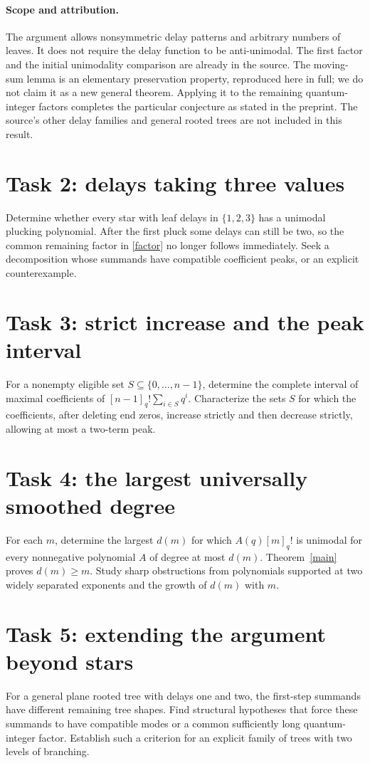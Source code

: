 \documentclass[11pt]{article}
\begin{document}
\paragraph{Scope and attribution.}
The argument allows nonsymmetric delay patterns and arbitrary
numbers of leaves. It does not require the delay function to be
anti-unimodal. The first factor and the initial unimodality
comparison are already in the source. The moving-sum lemma is
an elementary preservation property, reproduced here in full;
we do not claim it as a new general theorem. Applying it to
the remaining quantum-integer factors completes the particular
conjecture as stated in the preprint. The source's other delay
families and general rooted trees are not included in this result.

\section*{Task 2: delays taking three values}
Determine whether every star with leaf delays in $\{1,2,3\}$
has a unimodal plucking polynomial. After the first pluck some
delays can still be two, so the common remaining factor in
\eqref{factor} no longer follows immediately. Seek a decomposition
whose summands have compatible coefficient peaks, or an explicit
counterexample.

\section*{Task 3: strict increase and the peak interval}
For a nonempty eligible set $S\subseteq\{0,\ldots,n-1\}$,
determine the complete interval of maximal coefficients of
$[n-1]_q!\sum_{i\in S}q^i$. Characterize the sets $S$ for which
the coefficients, after deleting end zeros, increase strictly
and then decrease strictly, allowing at most a two-term peak.

\section*{Task 4: the largest universally smoothed degree}
For each $m$, determine the largest $d(m)$ for which
$A(q)[m]_q!$ is unimodal for every nonnegative polynomial $A$
of degree at most $d(m)$. Theorem~\ref{main} proves $d(m)\geq m$.
Study sharp obstructions from polynomials supported at two
widely separated exponents and the growth of $d(m)$ with $m$.

\section*{Task 5: extending the argument beyond stars}
For a general plane rooted tree with delays one and two,
the first-step summands have different remaining tree shapes.
Find structural hypotheses that force these summands to have
compatible modes or a common sufficiently long quantum-integer
factor. Establish such a criterion for an explicit family of
trees with two levels of branching.
\end{document}
